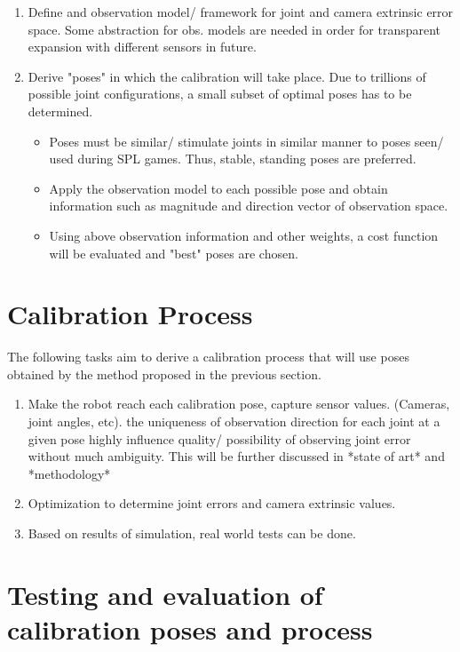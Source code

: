 \documentclass[english, printversion, nomenclature, notitle]{tuvisionthesis} %
\begin{document}
\begin{enumerate}
	\item Define and observation model/ framework for joint and camera extrinsic error space.
	\subitem Some abstraction for obs. models are needed in order for transparent expansion with different sensors in future.
	\item Derive "poses" in which the calibration will take place. Due to trillions of possible joint configurations, a small subset of optimal poses has to be determined.
	\begin{itemize}
		\item Poses must be similar/ stimulate joints in similar manner to poses seen/ used during SPL games. Thus, stable, standing poses are preferred.
		\item Apply the observation model to each possible pose and obtain information such as magnitude and direction vector of observation space.
		\item Using above observation information and other weights, a cost function will be evaluated and "best" poses are chosen.
	\end{itemize}
\end{enumerate}

\section{Calibration Process}
The following tasks aim to derive a calibration process that will use poses obtained by the method proposed in the previous section.

\begin{enumerate}
	\item Make the robot reach each calibration pose, capture sensor values. (Cameras, joint angles, etc).
	\subitem the uniqueness of observation direction for each joint at a given pose highly influence quality/ possibility of observing joint error without much ambiguity. This will be further discussed in *state of art* and *methodology*
	\item Optimization to determine joint errors and camera extrinsic values.
	\item Based on results of simulation, real world tests can be done.
\end{enumerate}

\section{Testing and evaluation of calibration poses and process}
\end{document}
